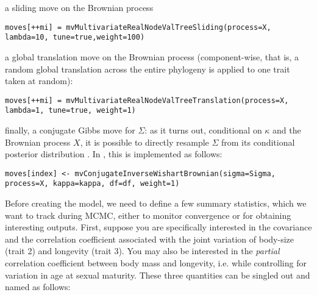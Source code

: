 a sliding move on the Brownian process
{\tt \small \begin{snugshade*}
\begin{lstlisting}
moves[++mi] = mvMultivariateRealNodeValTreeSliding(process=X, lambda=10, tune=true,weight=100)
\end{lstlisting}
\end{snugshade*}}
a global translation move on the Brownian process (component-wise, that is, a random global translation across the entire phylogeny is applied to one trait taken at random):
{\tt \small \begin{snugshade*}
\begin{lstlisting}
moves[++mi] = mvMultivariateRealNodeValTreeTranslation(process=X, lambda=1, tune=true, weight=1)
\end{lstlisting}
\end{snugshade*}}
finally, a conjugate Gibbs move for $\Sigma$: as it turns out, conditional on $\kappa$ and the Brownian process $X$, it is possible to directly resample $\Sigma$ from its conditional posterior distribution \citep{Lartillot2011}. In \RevBayes, this is implemented as follows:
{\tt \small \begin{snugshade*}
\begin{lstlisting}
moves[index] <- mvConjugateInverseWishartBrownian(sigma=Sigma, process=X, kappa=kappa, df=df, weight=1)
\end{lstlisting}
\end{snugshade*}}

Before creating the model, we need to define a few summary statistics, which we want to track during MCMC, either to monitor convergence or for obtaining interesting outputs.
First, suppose you are specifically interested in the covariance and the correlation coefficient associated with the joint variation of body-size (trait 2) and longevity (trait 3). You may also be interested in the \emph{partial} correlation coefficient between body mass and longevity, i.e. while controlling for variation in age at sexual maturity. These three quantities can be singled out and named as follows:


